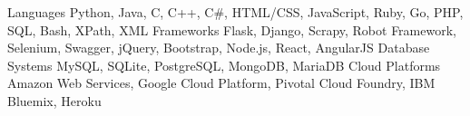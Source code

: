 \begin{cvskills}
  \cvskill
    {Languages}
    {Python, Java, C, C++, C\#, HTML/CSS, JavaScript, Ruby, Go, PHP, SQL, Bash, XPath, XML}
  \cvskill
    {Frameworks}
    {Flask, Django, Scrapy, Robot Framework, Selenium, Swagger, jQuery, Bootstrap, Node.js, React, AngularJS}
  \cvskill
    {Database Systems}
    {MySQL, SQLite, PostgreSQL, MongoDB, MariaDB}
  \cvskill
    {Cloud Platforms}
    {Amazon Web Services, Google Cloud Platform, Pivotal Cloud Foundry, IBM Bluemix, Heroku}
\end{cvskills}

